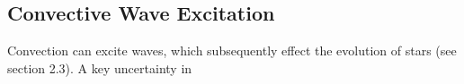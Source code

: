 {\color{purple}
\subsection{Convective Wave Excitation}
}

Convection can excite waves, which subsequently effect the evolution of stars (see section 2.3). A key uncertainty in 

